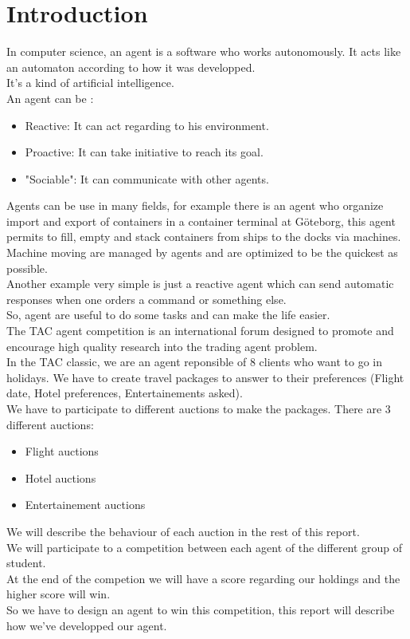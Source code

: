 \section*{Introduction}
In computer science, an agent is a software who works autonomously. It acts like an automaton according to how it was developped.\\
 It's a kind of artificial intelligence.\\
  An agent can be :\\
\begin{itemize}
	\item Reactive: It can act regarding to his environment.
	\item Proactive: It can take initiative to reach its goal.
	\item "Sociable": It can communicate with other agents.
\end{itemize}
Agents can be use in many fields, for example there is an agent who organize import and export of containers in a container terminal at Göteborg, this agent permits to fill, empty and stack containers from ships to the docks via machines. Machine moving are managed by agents and are optimized to be the quickest as possible.\\
Another example very simple is just a reactive agent which can send automatic responses when one orders a command or something else.\\
So, agent are useful to do some tasks and can make the life easier.\\
The TAC agent competition is an international forum designed to promote and encourage high quality research into the trading agent problem.\\
In the TAC classic, we are an agent reponsible of 8 clients who want to go in holidays. We have to create travel packages to answer to their preferences (Flight date, Hotel preferences, Entertainements asked).\\
We have to participate to different auctions to make the packages. There are 3 different auctions:\\
\begin{itemize}
\item Flight auctions
\item Hotel auctions
\item Entertainement auctions
\end{itemize}
We will describe the behaviour of each auction in the rest of this report.\\
We will participate to a competition between each agent of the different group of student.\\
At the end of the competion we will have a score regarding our holdings and the higher score will win.\\
So we have to design an agent to win this competition, this report will describe how we've developped our agent.
